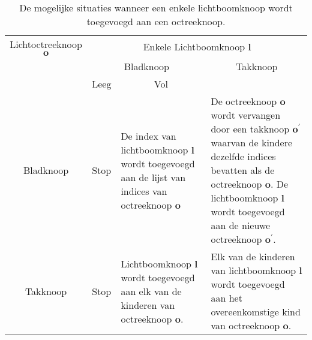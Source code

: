 \begin{table}
  \begin{tabularx}{\textwidth}{cXXX}\toprule
    Lichtoctreeknoop $\mathbf{o}$ & \multicolumn{3}{c}{Enkele Lichtboomknoop $\mathbf{l}$}                            \\
                                  & \multicolumn{2}{c}{Bladknoop}                      & \multicolumn{1}{c}{Takknoop} \\
                                  & \multicolumn{1}{c}{Leeg} & \multicolumn{1}{c}{Vol} &                              \\ \midrule
    Bladknoop &
      Stop &
    
      De index van lichtboomknoop $\mathbf{l}$ wordt toegevoegd aan de lijst van
      indices van octreeknoop $\mathbf{o}$ &

      De octreeknoop $\mathbf{o}$ wordt vervangen door een takknoop
      $\mathbf{o}^\prime$ waarvan de kindere dezelfde indices bevatten als de
      octreeknoop $\mathbf{o}$. De lichtboomknoop $\mathbf{l}$ wordt toegevoegd
      aan de nieuwe octreeknoop $\mathbf{o}^\prime$. \\

    Takknoop &
      Stop &

      Lichtboomknoop $\mathbf{l}$ wordt toegevoegd aan elk van de kinderen van
      octreeknoop $\mathbf{o}$. &

      Elk van de kinderen van lichtboomknoop $\mathbf{l}$ wordt toegevoegd aan
      het overeenkomstige kind van octreeknoop $\mathbf{o}$. \\ \bottomrule
  \end{tabularx}
  \caption{De mogelijke situaties wanneer een enkele lichtboomknoop wordt
           toegevoegd aan een octreeknoop.}
  \label{tbl:hs-lichtoctree}
\end{table}
